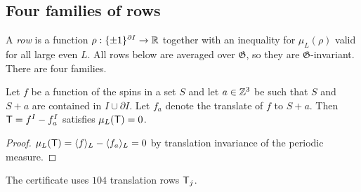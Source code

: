 \subsection{Four families of rows}\label{sec:rows}

A \emph{row} is a function $\rho:\{\pm1\}^{\partial I}\to\mathbb R$ together with an inequality for $\mu_L(\rho)$ valid for all large even $L$. All rows below are averaged over $\mathfrak G$, so they are $\mathfrak G$-invariant. There are four families.

\begin{lemma}\label{lem:translation}
Let $f$ be a function of the spins in a set $S$ and let $a\in\mathbb Z^3$ be such that $S$ and $S+a$ are contained in $I\cup\partial I$. Let $f_a$ denote the translate of $f$ to $S+a$. Then $\mathsf T=f^I-f_a^I$ satisfies $\mu_L(\mathsf T)=0$.
\end{lemma}

\begin{proof}
$\mu_L(\mathsf T)=\langle f\rangle_L-\langle f_a\rangle_L=0$ by translation invariance of the periodic measure.
\end{proof}

The certificate uses $104$ translation rows $\mathsf T_j$.

